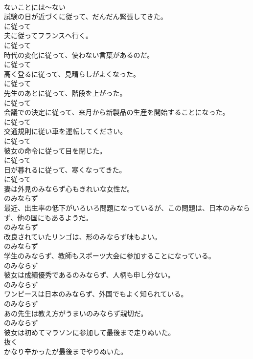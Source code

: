 \documentclass[8pt]{extreport}
\begin{document}
\begin{CJK}{UTF8}{min}
\\	ないことには～ない
\\	試験の日が近づくに従って、だんだん緊張してきた。	
\\	に従って
\\	夫に従ってフランスへ行く。	
\\	に従って
\\	時代の変化に従って、使わない言葉があるのだ。	
\\	に従って
\\	高く登るに従って、見晴らしがよくなった。	
\\	に従って
\\	先生のあとに従って、階段を上がった。	
\\	に従って
\\	会議での決定に従って、来月から新製品の生産を開始することになった。	
\\	に従って
\\	交通規則に従い車を運転してください。	
\\	に従って
\\	彼女の命令に従って目を閉じた。	
\\	に従って
\\	日が暮れるに従って、寒くなってきた。	
\\	に従って
\\	妻は外見のみならず心もきれいな女性だ。	
\\	のみならず
\\	最近、出生率の低下がいろいろ問題になっているが、この問題は、日本のみならず、他の国にもあるようだ。	
\\	のみならず
\\	改良されていたリンゴは、形のみならず味もよい。	
\\	のみならず
\\	学生のみならず、教師もスポーツ大会に参加することになっている。	
\\	のみならず
\\	彼女は成績優秀であるのみならず、人柄も申し分ない。	
\\	のみならず
\\	ワンピースは日本のみならず、外国でもよく知られている。	
\\	のみならず
\\	あの先生は教え方がうまいのみならず親切だ。	
\\	のみならず
\\	彼女は初めてマラソンに参加して最後まで走りぬいた。	
\\	抜く
\\	かなり辛かったが最後までやりぬいた。	

\end{CJK}
\end{document}
